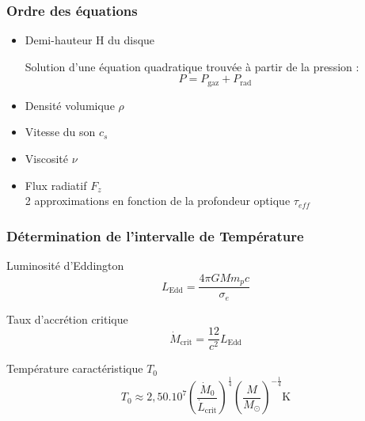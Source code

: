\documentclass[french]{beamer}
\begin{document}
\begin{frame}
\frametitle{Ordre des équations}
         \begin{itemize}
      \item Demi-hauteur H du disque

      Solution d'une équation quadratique trouvée à partir de la pression :
      \begin{equation}
         P = P_\mathrm{gaz} + P_\mathrm{rad}
      \end{equation}
      \item Densité volumique $\rho$
      \item Vitesse du son $c_s$ 
      \item Viscosité $\nu$ 
      \item Flux radiatif $F_z$
      \\
      2 approximations en fonction de la profondeur optique $\tau_{eff}$
   \end{itemize}
\end{frame}



\begin{frame}
\frametitle{Détermination de l'intervalle de Température} 
Luminosité d'Eddington
   \begin{equation}
      L_\mathrm{Edd} = \frac{4\pi GMm_pc}{\sigma_e}
   \end{equation}

Taux d’accrétion critique 
   \begin{equation}
      \dot{M}_\mathrm{crit} = \frac{12}{c^2}L_\mathrm{Edd} 
   \end{equation}

Température caractéristique $T_0$
   \begin{equation}
      T_0 \approx 2,50.10^7\left(\frac{\dot{M}_0}{\dot{L}_\mathrm{crit}}\right)^{\frac{1}{4}}\left(\frac{M}{M_\odot}\right)^{-\frac{1}{4}} \mathrm{K}
   \end{equation}


\end{frame}




\end{document}
